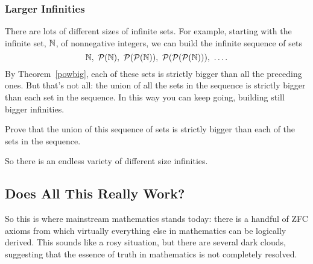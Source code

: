 \subsubsection{Larger Infinities}

There are lots of different sizes of infinite sets.  For example, starting
with the infinite set, $\mathbb{N}$, of nonnegative integers, we can build
the infinite sequence of sets
\[
\naturals,\ \power(\naturals),\ \power(\power(\naturals)),\
\power(\power(\power(\naturals))),\ \dots.
\]
By Theorem~\ref{powbig}, each of these sets is strictly bigger than all
the preceding ones.  But that's not all: the union of all the sets in the
sequence is strictly bigger than each set in the sequence.  In this way
you can keep going, building still bigger infinities.

\begin{notesproblem}{}
  Prove that the union of this sequence of sets is strictly bigger than
  each of the sets in the sequence.
\end{notesproblem}

So there is an endless variety of different size infinities.

\subsection{Does All This Really Work?}

So this is where mainstream mathematics stands today: there is a handful
of ZFC axioms from which virtually everything else in mathematics can be
logically derived.  This sounds like a rosy situation, but there are
several dark clouds, suggesting that the essence of truth in mathematics
is not completely resolved.

